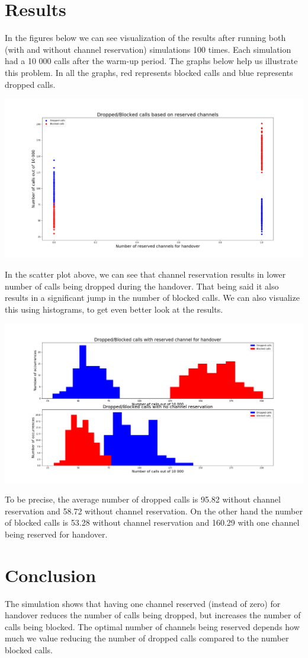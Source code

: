 \documentclass[12pt,a4paper]{article}
\begin{document}
\section{Results}
In the figures below we can see visualization of the results after running both (with and without channel reservation) simulations 100 times. Each simulation had a 10 000 calls after the warm-up period. The graphs below help us illustrate this problem. In all the graphs, red represents blocked calls and blue represents dropped calls.
\begin{center}
\includegraphics[width=6.5in]{Figure_14}
\end{center}
In the scatter plot above, we can see that channel reservation results in lower number of calls being dropped during the handover. That being said it also results in a significant jump in the number of blocked calls. We can also visualize this using histograms, to get even better look at the results.
\pagebreak
\begin{center}
\includegraphics[width=6.5in]{Figure_17}
\end{center}
To be precise, the average number of dropped calls is 95.82 without channel reservation and 58.72 without channel reservation. On the other hand the number of blocked calls is 53.28 without channel reservation and 160.29 with one channel being reserved for handover.

\section{Conclusion}
The simulation shows that having one channel reserved (instead of zero) for handover reduces the number of calls being dropped, but increases the number of calls being blocked. The optimal number of channels being reserved depends how much we value reducing the number of dropped calls compared to the number blocked calls.
\end{document}
